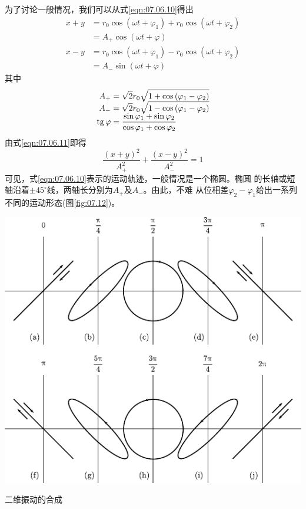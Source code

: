 为了讨论一般情况，我们可以从式\eqref{eqn:07.06.10}得出
\begin{equation}\label{eqn:07.06.11}
    \begin{split}
        x + y &= r _ { 0 }  \cos \left( \omega t + \varphi _ { 1 } \right) + r _ { 0 }  \cos \left( \omega t +  \varphi _ { 2 } \right)  \\[-0.5em]
        &= A _ { + }  \cos \left( \omega t + \varphi \right) \\[-0.5em]
        x - y &= r _ { 0 }  \cos \left( \omega t +  \varphi _ { 1 } \right) - r _ { 0 }  \cos \left( \omega t +  \varphi _ { 2 } \right)  \\[-0.5em]
        &= A _ { - }  \sin \left( \omega t + \varphi \right)
    \end{split}
\end{equation}
其中\vspace{-1.56em}
\begin{equation}\label{eqn:07.06.12}
    \begin{split}
        A _ { + } &= \sqrt { 2 } r _ { 0 } \sqrt { 1 + \cos \left( \varphi _ { 1 } -  \varphi _ { 2 } \right) }  \\[-0.5em]
        A _ { - } &= \sqrt { 2 } r _ { 0 } \sqrt { 1 - \cos \left( \varphi _ { 1 } -  \varphi _ { 2 } \right) } \\[-0.5em]
        \operatorname{tg} \varphi &= \frac { \sin \varphi _ { 1 } + \sin \varphi _ { 2 } } { \cos \varphi _ { 1 } + \cos \varphi _ { 2 } }
    \end{split}
\end{equation}
由式\eqref{eqn:07.06.11}即得
\begin{equation*}
    \frac { \left( x + y \right) ^ { 2 } } { A _ { + } ^ { 2 } } + \frac { \left( x - y \right) ^ { 2 } } { A _ { - } ^ { 2 } } = 1
\end{equation*}
可见，式\eqref{eqn:07.06.10}表示的运动轨迹，一般情况是一个椭圆。椭圆
的长轴或短轴沿着$ \pm 45 ^ { \circ } $线，两轴长分别为$ A _ { + } $及$ A _ { - } $。由此，不难
从位相差$ \varphi_{ 2 } - \varphi_{ 1 } $给出一系列不同的运动形态(图\ref{fig:07.12})。\vspace{1.56em}
\begin{figurex}
    \centering
    \includegraphics{figure/fig07.12}
    \caption{二维振动的合成}
    \label{fig:07.12}
\end{figurex}
